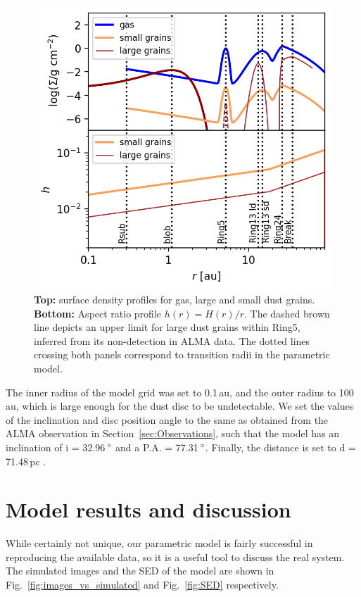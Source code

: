 \documentclass[fleqn,usenatbib,useAMS]{mnras}
\begin{document}
\begin{figure}
	\includegraphics[width=\columnwidth]{allprofiles.png}
        \caption{{\bf Top:} surface density profiles for gas, large and small dust grains. {\bf Bottom:} Aspect ratio profile $h(r)= H(r)/r$. The dashed brown line depicts an upper limit for large dust grains within Ring5, inferred from its non-detection in ALMA data. The dotted lines crossing both panels correspond to transition radii in the parametric model.}
    \label{fig:profiles}
\end{figure}

The inner radius of the model grid was set to 0.1\,au, and the outer radius to 100\,au, which is large enough for the dust disc to be undetectable. We set the values of the inclination and disc position angle to the same as obtained from the ALMA observation in Section~\ref{sec:Observations}, such that the model has an inclination of i = 32.96\,$\hbox{$^\circ$}$ and a P.A. = 77.31\,$\hbox{$^\circ$}$. Finally, the distance is set to d = 71.48\,pc \citep{gaiacollaboration2020gaia}.

\section{Model results and discussion} \label{sec:results}

While certainly not unique, our parametric model is fairly successful in reproducing the available data, so it is a useful tool to discuss the real system. The simulated images and the SED of the model are shown in Fig.~\ref{fig:images_vs_simulated} and Fig.~\ref{fig:SED} respectively.
\end{document}
